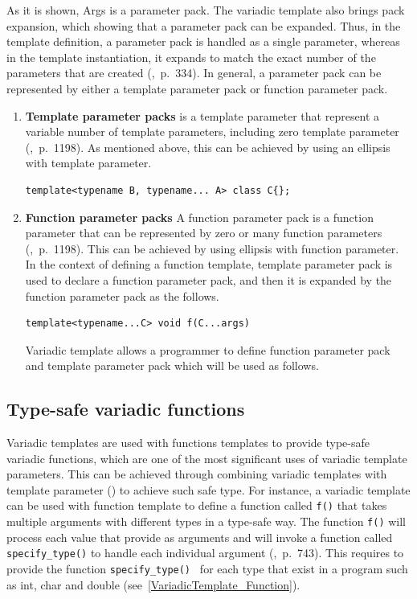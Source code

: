 \documentclass[11pt]{report}
\begin{document}
As it is shown, Args is a parameter pack. The variadic template also brings pack expansion, which showing that a parameter pack can be expanded. Thus, in the template definition, a parameter pack is handled as a single parameter, whereas in the template instantiation, it expands to match the exact number of the parameters that are created (\cite{Prata:2012:Cpp},~p.~334). In general, a parameter pack can be represented by either a template parameter pack or function parameter pack.

\begin{enumerate}
\item \textbf{Template parameter packs} is a template parameter that represent a variable number of template parameters, including zero template parameter (\cite{Prata:2012:Cpp},~p.~1198). As mentioned above, this can be achieved by using an ellipsis with template parameter.
\begin{lstlisting}
template<typename B, typename... A> class C{}; 
\end{lstlisting}


\item \textbf{Function parameter packs} A function parameter pack is a function parameter that can be represented by zero or many function parameters (\cite{Prata:2012:Cpp},~p.~1198). This can be achieved by using ellipsis with function parameter. In the context of defining a function template, template parameter pack is used to declare a function parameter pack, and then it is expanded by the function parameter pack as the follows.
\begin{lstlisting}
template<typename...C> void f(C...args)
\end{lstlisting}

Variadic template allows a programmer to define function parameter pack and template parameter pack which will be used as follows.

\end{enumerate}

\subsection{Type-safe variadic functions}
Variadic templates are used with functions templates to provide type-safe variadic functions, which are one of the most significant uses of variadic template parameters. This can be achieved through combining variadic templates with template parameter (\cite{Gregor:2007:VTC}) to achieve such safe type. For instance, a variadic template can be used with function template to define a function called \texttt{f()} that takes multiple arguments with different types in a type-safe way. The function \texttt{f()} will process each value that provide as arguments and will invoke a function called \texttt{ specify\_type()} to handle each individual argument (\cite{Gregorie:professionalcpp},~p.~743). This requires to provide the function \texttt{specify\_type() } for each type that exist in a program such as int, char and double (see~\ref{VariadicTemplate_Function}).
\end{document}
